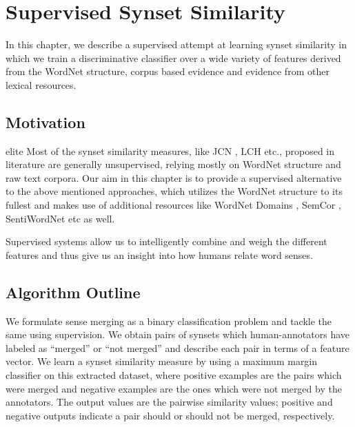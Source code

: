 \chapter{Supervised Synset Similarity}
\label{chapter:SupervisedSynsetSimilarity}
In this chapter, we describe a supervised attempt at learning synset similarity in which we train a discriminative classifier over a wide variety of features derived from the WordNet structure, corpus based evidence and evidence from other lexical resources.%

\section{Motivation}

elite 
Most of the synset similarity measures, like JCN \citep{JCN:1997}, LCH \citep{LCH:1998} etc., proposed in literature are generally unsupervised, relying mostly on WordNet structure and raw text corpora. Our aim in this chapter is to provide a supervised alternative to the above mentioned approaches, which utilizes the WordNet structure to its fullest and makes use of additional resources like WordNet Domains \citep{Gonzalez:XWND}, SemCor \citep{SemCor}, SentiWordNet \citep{Baccianella10sentiwordnet3.0} etc as well. 


Supervised systems allow us to intelligently combine and weigh the different features and thus give us an insight into how humans relate word senses.

\section{Algorithm Outline}
\label{sec:supervisedAlgoOutline}
We formulate sense merging as a binary classification problem and tackle the same using supervision. We obtain pairs of synsets which human-annotators have labeled as ``merged'' or ``not merged'' and describe each pair in terms of a feature vector. We learn a synset similarity measure by using a maximum margin classifier on this extracted dataset, where positive examples are the pairs which were merged and negative examples are the ones which were not merged by the annotators. The output values are the pairwise similarity values; positive and negative outputs indicate a pair should or should not be merged, respectively. 

